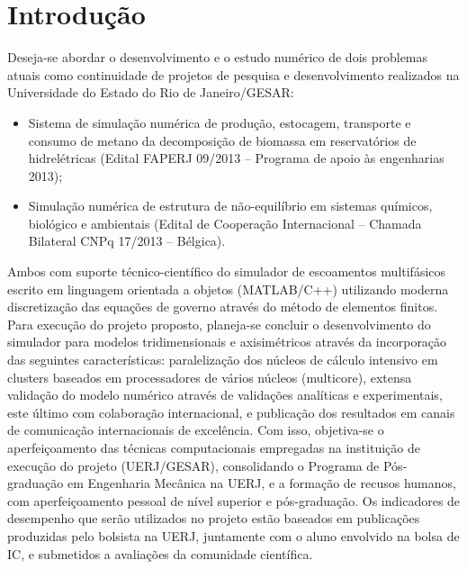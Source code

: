 \documentclass[a4paper,portuges,12pt]{article}
\begin{document}
\section{Introdução}
Deseja-se abordar o desenvolvimento e o estudo numérico de dois
problemas atuais como continuidade de projetos de pesquisa e
desenvolvimento realizados na Universidade do Estado do Rio de
Janeiro/GESAR: 

\begin{itemize}
\item Sistema de simulação numérica de produção, estocagem,
transporte e consumo de metano da decomposição de biomassa em
reservatórios de hidrelétricas (Edital FAPERJ 09/2013 – Programa de
apoio às engenharias 2013); 
\item Simulação numérica de estrutura de
não-equilíbrio em sistemas químicos, biológico e ambientais (Edital de
Cooperação Internacional – Chamada Bilateral CNPq 17/2013 – Bélgica).
\end{itemize}

Ambos com suporte técnico-científico do simulador de escoamentos
multifásicos escrito em linguagem orientada a objetos (MATLAB/C++)
utilizando moderna discretização das equações de governo através do
método de elementos finitos. Para execução do projeto proposto,
planeja-se concluir o desenvolvimento do simulador para modelos
tridimensionais e axisimétricos através da incorporação das seguintes
características: paralelização dos núcleos de cálculo intensivo em
clusters baseados em processadores de vários núcleos (multicore),
extensa validação do modelo numérico através de validações analíticas e
experimentais, este último com colaboração internacional, e publicação
dos resultados em canais de comunicação internacionais de excelência.
Com isso, objetiva-se o aperfeiçoamento das técnicas computacionais
empregadas na instituição de execução do projeto (UERJ/GESAR),
consolidando o Programa de Pós-graduação em Engenharia Mecânica na UERJ,
e a formação de recusos humanos, com aperfeiçoamento pessoal de nível
superior e pós-graduação. Os indicadores de desempenho que serão
utilizados no projeto estão baseados em publicações produzidas pelo
bolsista na UERJ, juntamente com o aluno envolvido na bolsa de IC, e
submetidos a avaliações da comunidade científica.
\end{document}
